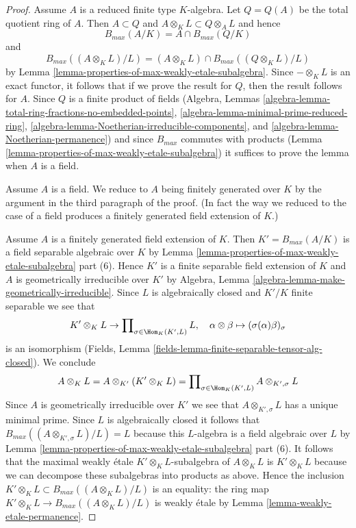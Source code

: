 \begin{proof}
\medskip\noindent
Assume $A$ is a reduced finite type $K$-algebra.
Let $Q = Q(A)$ be the total quotient ring of $A$.
Then $A \subset Q$ and $A \otimes_K L \subset Q \otimes_A L$
and hence
$$
B_{max}(A/K) = A \cap B_{max}(Q/K)
$$
and
$$
B_{max}((A \otimes_K L)/L) =
(A \otimes_K L) \cap B_{max}((Q \otimes_K L)/L)
$$
by Lemma \ref{lemma-properties-of-max-weakly-etale-subalgebra}.
Since $-\otimes_K L$ is an exact functor, it follows that
if we prove the result for $Q$, then the result follows for $A$.
Since $Q$ is a finite product of fields (Algebra, Lemmas
\ref{algebra-lemma-total-ring-fractions-no-embedded-points},
\ref{algebra-lemma-minimal-prime-reduced-ring},
\ref{algebra-lemma-Noetherian-irreducible-components}, and
\ref{algebra-lemma-Noetherian-permanence})
and since $B_{max}$ commutes with products
(Lemma \ref{lemma-properties-of-max-weakly-etale-subalgebra})
it suffices to prove the lemma when $A$ is a field.

\medskip\noindent
Assume $A$ is a field. We reduce to $A$ being finitely generated
over $K$ by the argument in the third paragraph of the proof.
(In fact the way we reduced to the case of a field produces
a finitely generated field extension of $K$.)

\medskip\noindent
Assume $A$ is a finitely generated field extension of $K$.
Then $K' = B_{max}(A/K)$ is a field separable algebraic over $K$ by
Lemma \ref{lemma-properties-of-max-weakly-etale-subalgebra} part (6).
Hence $K'$ is a finite separable field extension
of $K$ and $A$ is geometrically irreducible over $K'$ by
Algebra, Lemma \ref{algebra-lemma-make-geometrically-irreducible}.
Since $L$ is algebraically closed and $K'/K$ finite separable
we see that
$$
K' \otimes_K L \to \prod\nolimits_{\sigma \in \Hom_K(K', L)} L,\quad
\alpha \otimes \beta \mapsto (\sigma(\alpha)\beta)_\sigma
$$
is an isomorphism
(Fields, Lemma \ref{fields-lemma-finite-separable-tensor-alg-closed}).
We conclude
$$
A \otimes_K L = A \otimes_{K'} (K' \otimes_K L) =
\prod\nolimits_{\sigma \in \Hom_K(K', L)} A \otimes_{K', \sigma} L
$$
Since $A$ is geometrically irreducible over $K'$ we see that
$A \otimes_{K', \sigma} L$ has a unique minimal prime.
Since $L$ is algebraically closed it follows that
$B_{max}((A \otimes_{K', \sigma} L)/L) = L$
because this $L$-algebra is a field algebraic over $L$ by
Lemma \ref{lemma-properties-of-max-weakly-etale-subalgebra} part (6).
It follows that the maximal weakly \'etale $K' \otimes_K L$-subalgebra
of $A \otimes_K L$ is $K' \otimes_K L$ because we can decompose
these subalgebras into products as above. Hence the inclusion
$K' \otimes_K L \subset B_{max}((A \otimes_K L)/L)$ is an
equality: the ring map $K' \otimes_K L \to B_{max}((A \otimes_K L)/L)$
is weakly \'etale by
Lemma \ref{lemma-weakly-etale-permanence}.
\end{proof}